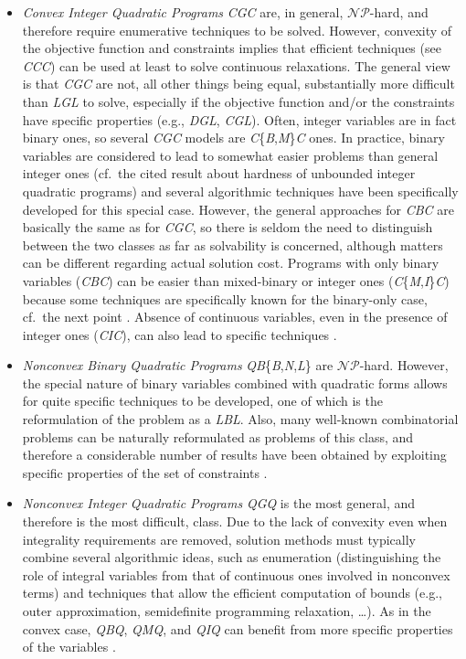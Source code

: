 \begin{itemize}
 \item \emph{Convex Integer Quadratic Programs} \textit{CGC} are, in general, $\mathcal{NP}$-hard, and therefore require enumerative techniques to be solved. However, convexity of the objective function and constraints implies that efficient techniques (see \textit{CCC}) can be used at least to solve continuous relaxations. The general view is that \textit{CGC} are not, all other things being equal,  substantially more difficult than \textit{LGL} to solve, especially if the objective function and/or the constraints have specific properties (e.g., \textit{DGL}, \textit{CGL}). Often, integer variables are in fact binary ones, so several \textit{CGC} models are \textit{C}\{\textit{B},\textit{M}\}\textit{C} ones. In practice, binary variables are considered to lead to somewhat easier problems than general integer ones (cf.~the cited result about hardness of unbounded integer quadratic programs) and several algorithmic techniques have been specifically developed for this special case. However, the general approaches for \textit{CBC} are basically the same as for \textit{CGC}, so there is seldom the need to distinguish between the two classes as far as solvability is concerned, although matters can be different regarding actual solution cost. Programs with only binary variables (\textit{CBC}) can be easier than mixed-binary or integer ones (\textit{C}\{\textit{M},\textit{I}\}\textit{C}) because some techniques are specifically known for the binary-only case, cf.~the next point \cite{BEP09}. Absence of continuous variables, even in the presence of integer ones (\textit{CIC}), can also lead to specific techniques \cite{BEL13}.
  \item \emph{Nonconvex Binary Quadratic Programs} \textit{QB}\{\textit{B},\textit{N},\textit{L}\} are $\mathcal{NP}$-hard. However, the special nature of binary variables combined with quadratic forms allows for quite specific techniques to be developed, one of which is the reformulation of the problem as a \textit{LBL}. Also, many well-known combinatorial problems can be naturally reformulated as problems of this class, and therefore a considerable number of results have been obtained by exploiting specific properties of the set of constraints \cite{Rendl2008,loiola-etal:2007}.
  \item \emph{Nonconvex Integer Quadratic Programs} \textit{QGQ} is the most general, and therefore is the most difficult, class. Due to the lack of convexity even when integrality requirements are removed, solution methods must typically combine several algorithmic ideas, such as enumeration (distinguishing the role of integral variables from that of continuous ones involved in nonconvex terms) and techniques that allow the efficient computation of bounds (e.g., outer approximation, semidefinite programming relaxation, \ldots). As in the convex case, \textit{QBQ}, \textit{QMQ}, and \textit{QIQ} can benefit from more specific properties of the variables \cite{Buchheim2013,Dong2016}.
\end{itemize}
